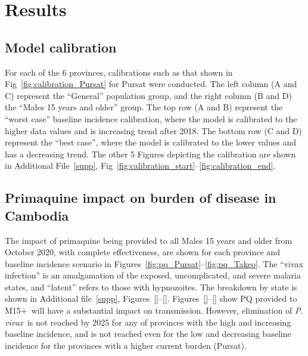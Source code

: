 \documentclass[doublespacing]{bmcart}
\newcommand{\pv}{\textit{P. vivax}}
\newcommand{\males}{M15$+$}
\begin{document}

\section*{Results}

\subsection*{Model calibration}
For each of the 6 provinces, calibrations such as that shown in Fig~\ref{fig:calibration_Pursat} for Pursat were conducted. The left column (A and C) represent the ``General'' population group, and the right column (B and D) the ``Males 15 years and older'' group. The top row (A and B) represent the ``worst case'' baseline incidence calibration, where the model is calibrated to the higher data values and is increasing trend after 2018. The bottom row (C and D) represent the ``best case'', where the model is calibrated to the lower values and has a decreasing trend. The other 5 Figures depicting the calibration are shown in Additional File~\ref{supp}, Fig~\ref{fig:calibration_start}--\ref{fig:calibration_end}.

\subsection*{Primaquine impact on burden of disease in Cambodia} \label{sec:impact}

The impact of primaquine being provided to all Males 15 years and older from October 2020, with complete effectiveness, are shown for each province and baseline incidence scenario in Figures~\ref{fig:pq_Pursat}--\ref{fig:pq_Takeo}. The ``vivax infection'' is an amalgamation of the exposed, uncomplicated, and severe malaria states, and ``latent'' refers to those with hypnozoites. The breakdown by state is shown in Additional file~\ref{supp}, Figures~\ref{}--\ref{}. Figures~\ref{}--\ref{} show PQ provided to \males~will have a substantial impact on transmission. However, elimination of \pv~is not reached by 2025 for any of provinces with the high and increasing baseline incidence, and is not reached even for the low and decreasing baseline incidence for the provinces with a higher current burden (Pursat). 
\end{document}
